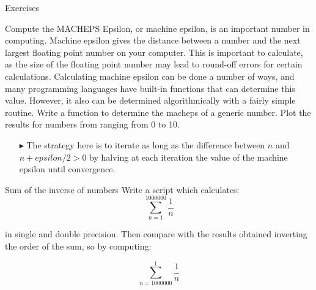 \documentclass[xcolor={dvipsnames,rgb}, aspectratio=169]{beamer}
\begin{document}
{%
   \begin{frame}[standout]
      Exercises
   \end{frame}
}

\begin{frame}{Compute the MACHEPS}
   Epsilon, or machine epsilon, is an important number in computing. Machine epsilon
   gives the distance between a number and the next largest floating point number on your
   computer. This is important to calculate, as the size of the floating point number may
   lead to round-off errors for certain calculations. Calculating machine epsilon can be
   done a number of ways, and many programming languages have built-in functions that can
   determine this value. However, it also can be determined algorithmically with a fairly
   simple routine. Write a function to determine the macheps of a generic number. Plot
   the results for numbers from ranging from 0 to 10.

   \begin{itemize}
      \item[$\blacktriangleright$] The strategy here is to iterate as long as the
         difference between $n$ and $n + epsilon / 2 > 0$ by halving at each iteration
         the value of the machine epsilon until convergence.
   \end{itemize}
\end{frame}

\begin{frame}{Sum of the inverse of numbers}
   Write a script which calculates:
   \begin{equation*} \sum_{n = 1}^{1000000}\frac{1}{n} \end{equation*}

   in \alert{single} and \alert{double} precision. Then compare with the results obtained
   inverting the order of the sum, so by computing:

   \begin{equation*} \sum_{n=1000000}^{1}\frac{1}{n} \end{equation*}
\end{frame}
\end{document}
